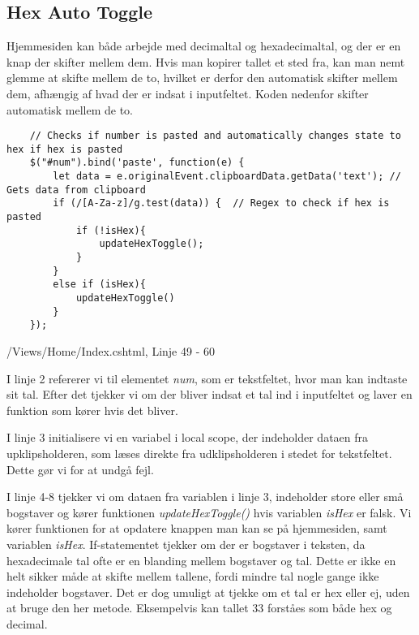 \documentclass[a4paper,12pt]{extarticle}
\begin{document}
    \subsection{Hex Auto Toggle}

    Hjemmesiden kan både arbejde med decimaltal og hexadecimaltal, og der er en knap der skifter mellem dem.
    Hvis man kopirer tallet et sted fra, kan man nemt glemme at skifte mellem de to, hvilket er derfor den automatisk
    skifter mellem dem, afhængig af hvad der er indsat i inputfeltet.
    Koden nedenfor skifter automatisk mellem de to.

    \begin{listing}[!ht]
        \begin{verbatim}
    // Checks if number is pasted and automatically changes state to hex if hex is pasted
    $("#num").bind('paste', function(e) {
        let data = e.originalEvent.clipboardData.getData('text'); // Gets data from clipboard
        if (/[A-Za-z]/g.test(data)) {  // Regex to check if hex is pasted
            if (!isHex){
                updateHexToggle();
            }
        }
        else if (isHex){
            updateHexToggle()
        }
    });
        \end{verbatim}
        \caption{/Views/Home/Index.cshtml, Linje 49 - 60}
    \end{listing}

    \medskip

    I linje 2 refererer vi til elementet \emph{num}, som er tekstfeltet, hvor man kan indtaste sit tal.
    Efter det tjekker vi om der bliver indsat et tal ind i inputfeltet og laver en funktion som kører hvis det bliver.

    \medskip

    I linje 3 initialisere vi en variabel i local scope, der indeholder dataen fra upklipsholderen, som læses direkte fra udklipsholderen i stedet for tekstfeltet.
    Dette gør vi for at undgå fejl.

    \medskip

    I linje 4-8 tjekker vi om dataen fra variablen i linje 3, indeholder store eller små bogstaver og kører funktionen \emph{updateHexToggle()} hvis variablen \emph{isHex} er falsk.
    Vi kører funktionen for at opdatere knappen man kan se på hjemmesiden, samt variablen \emph{isHex}.
    If-statementet tjekker om der er bogstaver i teksten, da hexadecimale tal ofte er en blanding mellem bogstaver og tal.
    Dette er ikke en helt sikker måde at skifte mellem tallene, fordi mindre tal nogle gange ikke indeholder bogstaver.
    Det er dog umuligt at tjekke om et tal er hex eller ej, uden at bruge den her metode. Eksempelvis kan tallet 33 forståes som både hex og decimal.
\end{document}

